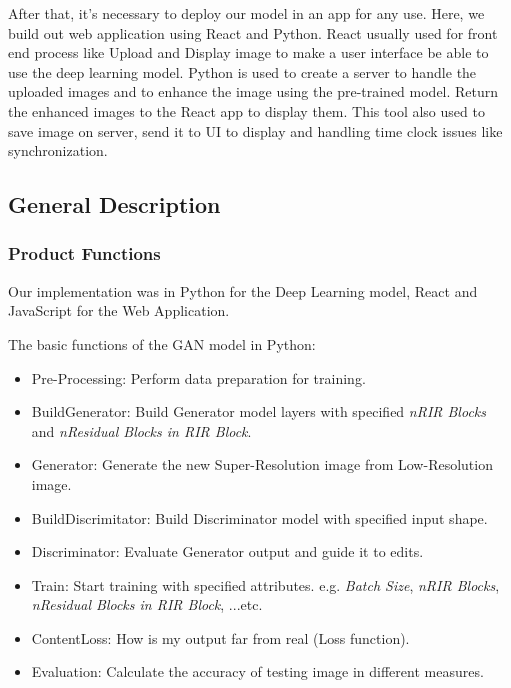\documentclass[12pt]{article}
\begin{document}
				After that, it’s necessary to deploy our model in an app for any use. Here, we build out web application using React and Python. React usually used for front end process like Upload and Display image to make a user interface be able to use the deep learning model. Python is used to create a server to handle the uploaded images and to enhance the image using the pre-trained model. Return the enhanced images to the React app to display them. This tool also used to save image on server, send it to UI to display and handling time clock issues like synchronization.
		\subsection{General Description}
			\subsubsection{Product Functions}
				Our implementation was in Python for the Deep Learning model, React and JavaScript for the Web Application.
				
				The basic functions of the GAN model in Python:
				\begin{itemize}
					\item Pre-Processing: Perform data preparation for training.
					\item BuildGenerator: Build Generator model layers with specified \textit{nRIR Blocks} and \textit{nResidual Blocks in RIR Block}.
					\item Generator: Generate the new Super-Resolution image from Low-Resolution image.
					\item BuildDiscrimitator: Build Discriminator model with specified input shape.
					\item Discriminator: Evaluate Generator output and guide it to edits.
					\item Train: Start training with specified attributes. e.g. \textit{Batch Size}, \textit{nRIR Blocks}, \textit{nResidual Blocks in RIR Block}, ...etc.
					\item ContentLoss: How is my output far from real (Loss function).
					\item Evaluation: Calculate the accuracy of testing image in different measures. 
				\end{itemize}
				
\end{document}
